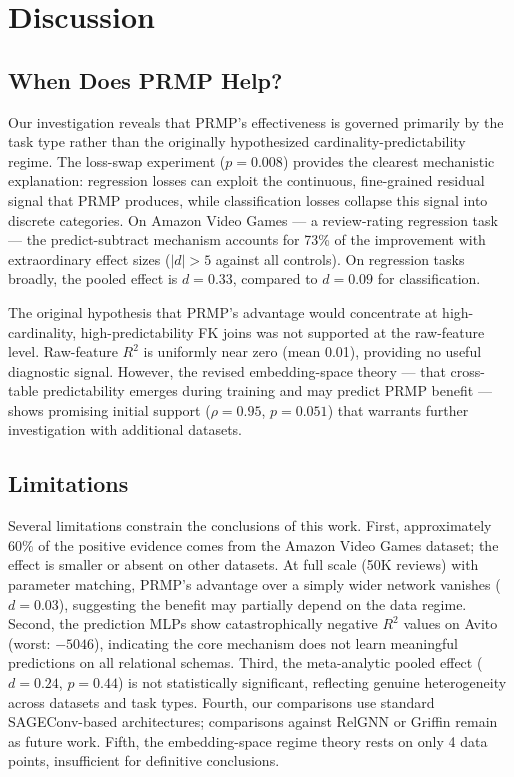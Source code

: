 \documentclass[11pt,letterpaper]{article}
\begin{document}
\section{Discussion}
\label{sec:discussion}

\subsection{When Does PRMP Help?}

Our investigation reveals that PRMP's effectiveness is governed primarily by the task type rather than the originally hypothesized cardinality-predictability regime. The loss-swap experiment ($p = 0.008$) provides the clearest mechanistic explanation: regression losses can exploit the continuous, fine-grained residual signal that PRMP produces, while classification losses collapse this signal into discrete categories. On Amazon Video Games --- a review-rating regression task --- the predict-subtract mechanism accounts for 73\% of the improvement with extraordinary effect sizes ($|d| > 5$ against all controls). On regression tasks broadly, the pooled effect is $d = 0.33$, compared to $d = 0.09$ for classification.

The original hypothesis that PRMP's advantage would concentrate at high-cardinality, high-predictability FK joins was not supported at the raw-feature level. Raw-feature $R^2$ is uniformly near zero (mean 0.01), providing no useful diagnostic signal. However, the revised embedding-space theory --- that cross-table predictability emerges during training and may predict PRMP benefit --- shows promising initial support ($\rho = 0.95$, $p = 0.051$) that warrants further investigation with additional datasets.

\subsection{Limitations}

Several limitations constrain the conclusions of this work. First, approximately 60\% of the positive evidence comes from the Amazon Video Games dataset; the effect is smaller or absent on other datasets. At full scale (50K reviews) with parameter matching, PRMP's advantage over a simply wider network vanishes ($d = 0.03$), suggesting the benefit may partially depend on the data regime. Second, the prediction MLPs show catastrophically negative $R^2$ values on Avito (worst: $-5046$), indicating the core mechanism does not learn meaningful predictions on all relational schemas. Third, the meta-analytic pooled effect ($d = 0.24$, $p = 0.44$) is not statistically significant, reflecting genuine heterogeneity across datasets and task types. Fourth, our comparisons use standard SAGEConv-based architectures; comparisons against RelGNN \citep{Chen2025} or Griffin \citep{Wang2025} remain as future work. Fifth, the embedding-space regime theory rests on only 4 data points, insufficient for definitive conclusions.
\end{document}
